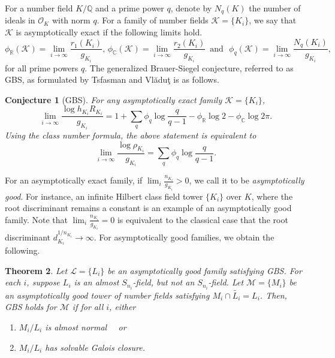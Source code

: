 \documentclass[12pt]{amsart}
\newtheorem{theorem}{Theorem}[section]
\newtheorem{conjecture}[theorem]{Conjecture}
\theoremstyle{definition}
\newcommand{\Q}{\mathbb{Q}}
\newcommand{\R}{\mathbb{R}}
\newcommand{\C}{\mathbb{C}}
\newcommand{\rK}{\mathcal{K}}
\newcommand{\rL}{\mathcal{L}}
\newcommand{\rM}{\mathcal{M}}
\newcommand{\rO}{\mathcal{O}}
\begin{document}
For a number field $K/\Q$ and a prime power $q$, denote by $N_q(K)$ the number of ideals in $\rO_K$ with norm $q$. For a family of number fields $\rK=\{K_i\}$, we say that $\rK$ is asymptotically exact if the following limits hold.
\begin{equation*}
    \phi_{\R}(\rK) = \lim_{i\to\infty} \frac{r_1(K_i)}{g_{K_i}}, \, 
    \phi_{\C}(\rK) = \lim_{i\to\infty} \frac{r_2(K_i)}{g_{K_i}}\,\, \, \text{and}\,\,\,\,
    \phi_{q}(\rK) = \lim_{i\to\infty} \frac{N_q(K_i)}{g_{K_i}},
\end{equation*}
for all prime powers $q$. The generalized Brauer-Siegel conjecture, referred to as GBS, as formulated by Tsfasman and Vl\u{a}du\c{t} \cite{TV} is as follows. 
\begin{conjecture}[GBS]\label{BS}
For any asymptotically exact family $\mathcal{K}=\{K_i\}$,
\begin{equation*}\label{BS1}
\lim_{i\to\infty} \frac{\log h_{K_i}R_{K_i}}{g_{K_i}}=1 + \sum_q \phi_q \log\frac{q}{q-1} -\phi_{\mathbb{R}} \log 2 - \phi_{\mathbb{C}}\log 2\pi.
\end{equation*}
Using the class number formula, the above statement is equivalent to
\begin{equation*}\label{BS2}
\lim_{i\to\infty} \frac{\log \rho_{K_i}}{g_{K_i}} =  \sum_q \phi_q \log\frac{q}{q-1}.
\end{equation*}
\end{conjecture}
For an asymptotically exact family, if $\lim_i \frac{n_{K_i}}{g_{K_i}}>0$, we call it to be \textit{asymptotically good}. For instance, an infinite Hilbert class field tower $\{K_i\}$ over $K$, where the root discriminant remains a constant is an example of an asymptotically good family. Note that $\lim_i \frac{n_{K_i}}{g_{K_i}}=0$ is equivalent to the classical case that the root discriminant $d_{K_i}^{1/n_{K_i}} \to \infty$. For asymptotically good families, we obtain the following. 

\begin{theorem}\label{asymp-good-theorem}
    Let $\rL=\{L_i\}$ be an asymptotically good family satisfying GBS. For each $i$, suppose $L_i$ is an almost $S_{n_i}$-field, but not an $S_{n_i}$-field.  Let $\rM=\{M_i\}$ be an asymptotically good tower of number fields satisfying $M_i\cap \widetilde{L_i}=L_i$. Then, GBS holds for $\rM$ if for all $i$, either
    \begin{enumerate}
        \item $M_i/L_i$ is almost normal \,\,\,\, or 
        \item $M_i/L_i$ has solvable Galois closure. 
    \end{enumerate}
\end{theorem}  
\end{document}
